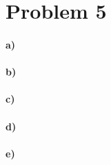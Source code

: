\documentclass[12pt]{article}
\begin{document}
\section*{Problem 5}

\paragraph{a)}

\paragraph{b)}

\paragraph{c)}

\paragraph{d)}

\paragraph{e)}
\end{document}
